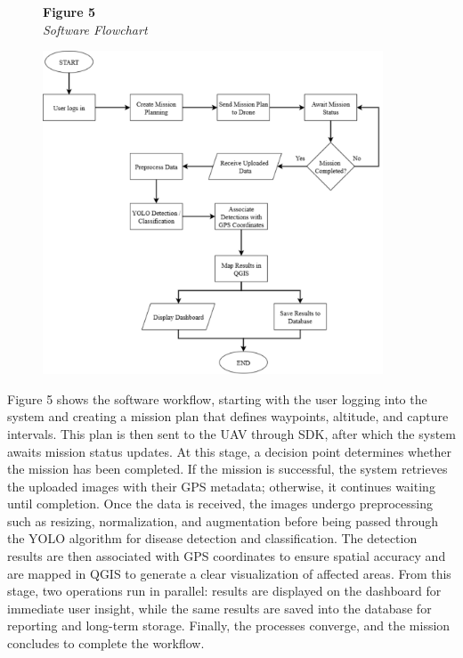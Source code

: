 	\begin{figure}[H]
		\raggedright
		\textbf{Figure 5} \\ %
		\textit{Software Flowchart} %
		
		\vspace{0.5em}
		\centering
		\includegraphics[width=0.9\textwidth]{figures/Soft_Flow.pdf} %
		
		\vspace{0.5em}
		\raggedright
		
		\label{fig:SoftFlow}
	\end{figure}
	
	Figure 5 shows the software workflow, starting with the user logging into the system and creating a mission plan that defines waypoints, altitude, and capture intervals. This plan is then sent to the UAV through SDK, after which the system awaits mission status updates. At this stage, a decision point determines whether the mission has been completed. If the mission is successful, the system retrieves the uploaded images with their GPS metadata; otherwise, it continues waiting until completion. Once the data is received, the images undergo preprocessing such as resizing, normalization, and augmentation before being passed through the YOLO algorithm for disease detection and classification. The detection results are then associated with GPS coordinates to ensure spatial accuracy and are mapped in QGIS to generate a clear visualization of affected areas. From this stage, two operations run in parallel: results are displayed on the dashboard for immediate user insight, while the same results are saved into the database for reporting and long-term storage. Finally, the processes converge, and the mission concludes to complete the workflow.
	
